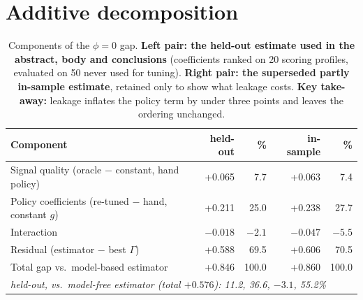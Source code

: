 \documentclass{article}
\begin{document}
\section{Additive decomposition}
\label{app:decomp}
\begin{table}[H]
  \caption{Components of the $\phi{=}0$ gap. \textbf{Left pair: the held-out estimate used in the abstract, body and conclusions} (coefficients ranked on 20 scoring profiles, evaluated on 50 never used for tuning). \textbf{Right pair: the superseded partly in-sample estimate}, retained only to show what leakage costs. \textbf{Key take-away:} leakage inflates the policy term by under three points and leaves the ordering unchanged.}
  \centering\small
  \begin{tabular}{lrrrr}
    \toprule
    Component & held-out & \% & in-sample & \% \\
    \midrule
    Signal quality (oracle $-$ constant, hand policy) & +0.065 & 7.7 & +0.063 & 7.4 \\
    Policy coefficients (re-tuned $-$ hand, constant $g$) & +0.211 & 25.0 & +0.238 & 27.7 \\
    Interaction & $-0.018$ & $-2.1$ & $-0.047$ & $-5.5$ \\
    Residual (estimator $-$ best $\Gamma$) & +0.588 & 69.5 & +0.606 & 70.5 \\
    \midrule
    Total gap vs.\ model-based estimator & +0.846 & 100.0 & +0.860 & 100.0 \\
    \midrule
    \multicolumn{5}{l}{\emph{held-out, vs.\ model-free estimator (total $+0.576$): 11.2, 36.6, $-3.1$, 55.2\%}} \\
    \bottomrule
  \end{tabular}
\end{table}
\end{document}
